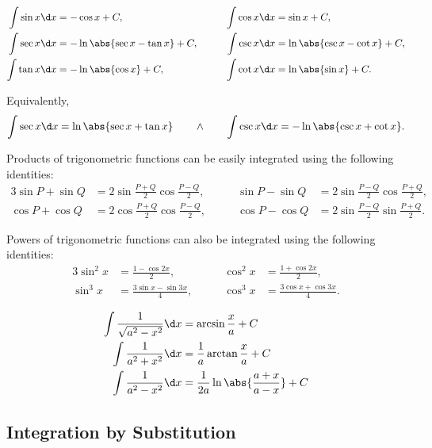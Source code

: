 \begin{proposition}
    \begin{alignat*}{3}
        \int \sin x \d x &= -\cos x + C, \qquad & \int \cos x \d x &= \sin x + C,\\
        \int \sec x \d x &= -\ln \abs{\sec x - \tan x} + C, \qquad & \int \csc x \d x &= \ln \abs{\csc x - \cot x} + C,\\
        \int \tan x \d x &= -\ln \abs{\cos x} + C, \qquad & \int \cot x \d x &= \ln \abs{\sin x} + C.
    \end{alignat*}
\end{proposition}

Equivalently, \[\int \sec x \d x = \ln \abs{\sec x + \tan x} \qquad \land \qquad \int \csc x \d x = -\ln \abs{\csc x + \cot x}.\]

Products of trigonometric functions can be easily integrated using the following identities:
\begin{alignat*}{3}
    \sin P + \sin Q &= 2 \sin \frac{P + Q}{2} \cos \frac{P - Q}{2}, \qquad & \sin P - \sin Q &= 2 \sin \frac{P - Q}{2} \cos \frac{P + Q}{2},\\
    \cos P + \cos Q &= 2 \cos \frac{P + Q}{2} \cos \frac{P - Q}{2}, \qquad & \cos P - \cos Q &= 2 \sin \frac{P - Q}{2} \sin \frac{P + Q}{2}.
\end{alignat*}

Powers of trigonometric functions can also be integrated using the following identities:
\begin{alignat*}{3}
    \sin^2 x &= \frac{1 - \cos 2x}{2}, \qquad & \cos^2 x &= \frac{1 + \cos 2x}{2},\\
    \sin^3 x &= \frac{3\sin x - \sin 3x}{4}, \qquad & \cos^3 x &= \frac{3\cos x + \cos 3x}{4}.
\end{alignat*}

\begin{proposition}
    \begin{align*}
        \int \frac1{\sqrt{a^2 - x^2}} \d x &= \arcsin \frac{x}{a} + C\\
        \int \frac1{a^2 + x^2} \d x &= \frac1{a} \arctan \frac{x}{a} + C\\
        \int \frac1{a^2 - x^2} \d x &= \frac1{2a} \ln \abs{\frac{a + x}{a-x}} + C
    \end{align*}
\end{proposition}

\subsection{Integration by Substitution}

